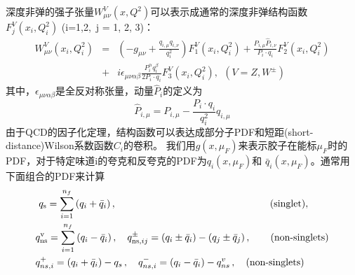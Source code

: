 深度非弹的强子张量$W_{\mu \nu}^V(x, Q^2)$可以表示成通常的深度非弹结构函数$F_j^V(x_i, Q_i^2)$
(i=1,2,~j = 1, 2, 3)：
\begin{eqnarray}
\label{eq:disWmunu} W_{\mu \nu}^{V}(x_i, Q_i^2) &=& \left( -g_{\mu
\nu} + \frac{q_{i,\mu} q_{i,\nu}}{q_i^2} \right) F_{1}^{V}(x_i,
Q_i^2) + \frac{\hat{P}_{i,\mu} \hat{P}_{i,\nu}}{P_i \cdot q_i}
F_{2}^{V}(x_i, Q_i^2) 
\nonumber \\
&+& 
i \epsilon_{\mu \nu \alpha \beta}
\frac{P_i^\alpha q_i^\beta}{2 P_i \cdot q_i} F_{3}^{V}(x_i,
Q_i^2),~~ (V = Z, W^{\pm})
\end{eqnarray}
其中，$\epsilon_{\mu\nu\alpha\beta}$是全反对称张量，动量${\hat P}_i$的定义为
\begin{equation}
\label{eq:def-Phat} \hat{P}_{i,\mu} = P_{i,\mu} - \frac{P_i \cdot
q_i}{q_i^2} q_{i,\mu}
\end{equation}
由于QCD的因子化定理，结构函数可以表达成部分子PDF和短距(short-distance)Wilson系数函数$C_i$的卷积。
我们用$g(x,\mu_F)$来表示胶子在能标$\mu_F$时的PDF，对于特定味道i的夸克和反夸克的PDF为$q_i(x,\mu_F)$和
$\bar{q}_i(x,\mu_F)$。通常用下面组合的PDF来计算
\begin{eqnarray}
\begin{split}
& ~q_{{\rm s}} = \sum_{i=1}^{n_f} \left( q_i + \bar{q}_i \right),
~~~~~~~~~~~~~~~~~~~~~~~~~~~~~~~~~~~~~~~~~~~~~~~  (\mbox{singlet}), \\
& q_{{\rm ns}}^{{\rm v}} = \sum_{i=1}^{n_f} \left( q_i - \bar{q}_i
\right),~~~ q^{\pm}_{{\rm ns}, ij} = \left( q_i \pm \bar{q}_i
\right) - \left( q_j \pm \bar{q}_j \right),~~~~~~
(\mbox{non-singlets}) \\
& q^+_{ns,i} = (q_i + \bar{q}_i) - q_s\,, \quad q^-_{ns,i} =  (q_i-\bar{q}_i) - q^v_{ns} \,,
\quad (\mbox{non-singlets})
\end{split}
\end{eqnarray}

